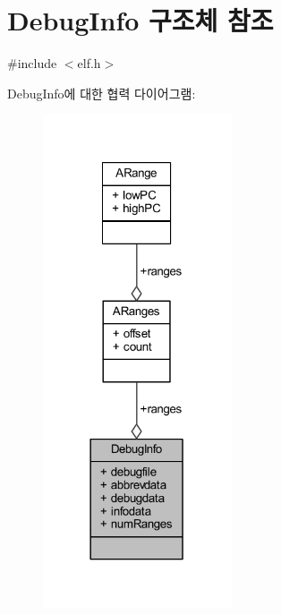 \hypertarget{struct_debug_info}{}\section{Debug\+Info 구조체 참조}
\label{struct_debug_info}


{\ttfamily \#include $<$elf.\+h$>$}



Debug\+Info에 대한 협력 다이어그램\+:\nopagebreak
\begin{figure}[H]
\begin{center}
\leavevmode
\includegraphics[width=158pt]{struct_debug_info__coll__graph}
\end{center}
\end{figure}
